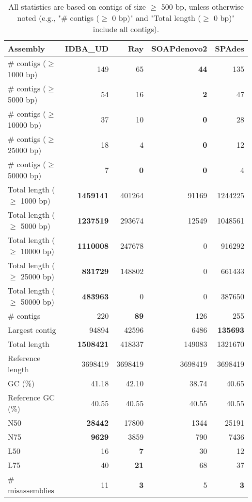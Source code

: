 \documentclass[12pt,a4paper]{article}
\begin{document}
\begin{table}[ht]
\begin{center}
\caption{All statistics are based on contigs of size $\geq$ 500 bp, unless otherwise noted (e.g., "\# contigs ($\geq$ 0 bp)" and "Total length ($\geq$ 0 bp)" include all contigs).}
\begin{tabular}{|l*{4}{|r}|}
\hline
Assembly & IDBA\_UD & Ray & SOAPdenovo2 & SPAdes \\ \hline
\# contigs ($\geq$ 1000 bp) & 149 & 65 & {\bf 44} & 135 \\ \hline
\# contigs ($\geq$ 5000 bp) & 54 & 16 & {\bf 2} & 47 \\ \hline
\# contigs ($\geq$ 10000 bp) & 37 & 10 & {\bf 0} & 28 \\ \hline
\# contigs ($\geq$ 25000 bp) & 18 & 4 & {\bf 0} & 12 \\ \hline
\# contigs ($\geq$ 50000 bp) & 7 & {\bf 0} & {\bf 0} & 4 \\ \hline
Total length ($\geq$ 1000 bp) & {\bf 1459141} & 401264 & 91169 & 1244225 \\ \hline
Total length ($\geq$ 5000 bp) & {\bf 1237519} & 293674 & 12549 & 1048561 \\ \hline
Total length ($\geq$ 10000 bp) & {\bf 1110008} & 247678 & 0 & 916292 \\ \hline
Total length ($\geq$ 25000 bp) & {\bf 831729} & 148802 & 0 & 661433 \\ \hline
Total length ($\geq$ 50000 bp) & {\bf 483963} & 0 & 0 & 387650 \\ \hline
\# contigs & 220 & {\bf 89} & 126 & 255 \\ \hline
Largest contig & 94894 & 42596 & 6486 & {\bf 135693} \\ \hline
Total length & {\bf 1508421} & 418337 & 149083 & 1321670 \\ \hline
Reference length & 3698419 & 3698419 & 3698419 & 3698419 \\ \hline
GC (\%) & 41.18 & 42.10 & 38.74 & 40.65 \\ \hline
Reference GC (\%) & 40.55 & 40.55 & 40.55 & 40.55 \\ \hline
N50 & {\bf 28442} & 17800 & 1344 & 25191 \\ \hline
N75 & {\bf 9629} & 3859 & 790 & 7436 \\ \hline
L50 & 16 & {\bf 7} & 30 & 12 \\ \hline
L75 & 40 & {\bf 21} & 68 & 37 \\ \hline
\# misassemblies & 11 & {\bf 3} & 5 & {\bf 3} \\ \hline

\end{tabular}
\end{center}
\end{table}
\end{document}
